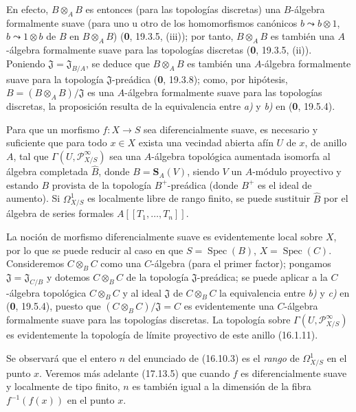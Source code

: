 En efecto, $B\otimes_A B$ es entonces (para las topologías discretas) una
$B$-álgebra formalmente suave (para uno u otro de los homomorfismos
canónicos $b\leadsto b\otimes1$, $b\leadsto1\otimes b$ de $B$
en $B\otimes_A B$) (\textbf 0, 19.3.5, (iii)); por tanto, $B\otimes_A B$ es también
una $A$-álgebra formalmente suave para las topologías discretas (\textbf 0, 19.3.5,
(ii)). Poniendo $\mathfrak{J}=\mathfrak{J}_{B/A}$, se deduce que
$B\otimes_A B$ es también una $A$-álgebra formalmente suave para la topología
$\mathfrak{J}$-preádica (\textbf 0, 19.3.8); como, por hipótesis,
$B=(B\otimes_A B)/\mathfrak{J}$ es una $A$-álgebra formalmente suave para
las topologías discretas, la proposición resulta de la equivalencia entre \emph{a)}
y \emph{b)} en (\textbf 0, 19.5.4).

\begin{proposition}[16.10.3]
\label{IV.16.10.3}
Para que un morfismo $f:X\to S$ sea diferencialmente suave, es necesario y
suficiente que para todo $x\in X$ exista una vecindad abierta afín $U$ de
$x$, de anillo $A$, tal que $\Gamma(U,\mathscr{P}_{X/S}^{\infty})$ sea una
$A$-álgebra topológica aumentada isomorfa al álgebra completada $\widehat B$,
donde $B=\mathbf{S}_A(V)$, siendo $V$ un $A$-módulo proyectivo y estando
$B$ provista de la topología $B^+$-preádica (donde $B^+$ es el ideal de aumento). Si
$\varOmega_{X/S}^1$ es localmente libre de rango finito, se puede sustituir
$\widehat B$ por el álgebra de series formales $A[[T_1,\ldots,T_n]]$.
\end{proposition}

La noción de morfismo diferencialmente suave es evidentemente local sobre
$X$, por lo que se puede reducir al caso en que $S=\operatorname{Spec}(B)$,
$X=\operatorname{Spec}(C)$. Consideremos $C\otimes_B C$ como una $C$-álgebra
(para el primer factor); pongamos $\mathfrak{J}=\mathfrak{J}_{C/B}$ y
dotemos $C\otimes_B C$ de la topología $\mathfrak{J}$-preádica; se puede
aplicar a la $C$-álgebra topológica $C\otimes_B C$ y al ideal
$\mathfrak{J}$ de $C\otimes_B C$ la equivalencia entre \emph{b)} y \emph{c)} en (\textbf 0, 19.5.4),
puesto que $(C\otimes_B C)/\mathfrak{J}=C$ es evidentemente una $C$-álgebra
formalmente suave para las topologías discretas. La topología sobre
$\Gamma(U,\mathscr{P}_{X/S}^{\infty})$ es evidentemente la topología de límite
proyectivo de este anillo (16.1.11).

Se observará que el entero $n$ del enunciado de (16.10.3) es el \emph{rango} de
$\varOmega_{X/S}^1$ en el punto $x$. Veremos más adelante (17.13.5) que cuando
$f$ es diferencialmente suave y localmente de tipo finito, $n$ es también
igual a la dimensión de la fibra $f^{-1}(f(x))$ en el punto $x$.


